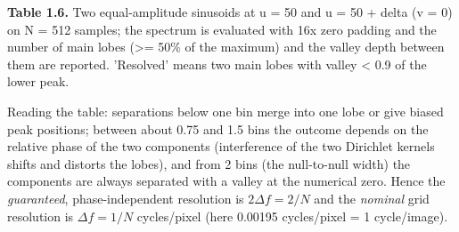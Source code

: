 \documentclass[10pt,a4paper]{article}
\begin{document}
\begin{table}[H]\centering\footnotesize{\small\textbf{Table 1.6.} Two equal-amplitude sinusoids at u = 50 and u = 50 + delta (v = 0) on N = 512 samples; the spectrum is evaluated with 16x zero padding and the number of main lobes (\textgreater{}= 50\% of the maximum) and the valley depth between them are reported. 'Resolved' means two main lobes with valley \textless{} 0.9 of the lower peak.\par}\vskip 3pt
\end{table}
Reading the table: separations below one bin merge into one lobe or give biased peak positions; between about 0.75 and 1.5 bins the outcome depends on the relative phase of the two components (interference of the two Dirichlet kernels shifts and distorts the lobes), and from 2 bins (the null-to-null width) the components are always separated with a valley at the numerical zero. Hence the \textit{guaranteed}, phase-independent resolution is $2\Delta f=2/N$ and the \textit{nominal} grid resolution is $\Delta f=1/N$ cycles/pixel (here 0.00195 cycles/pixel = 1 cycle/image).
\end{document}
